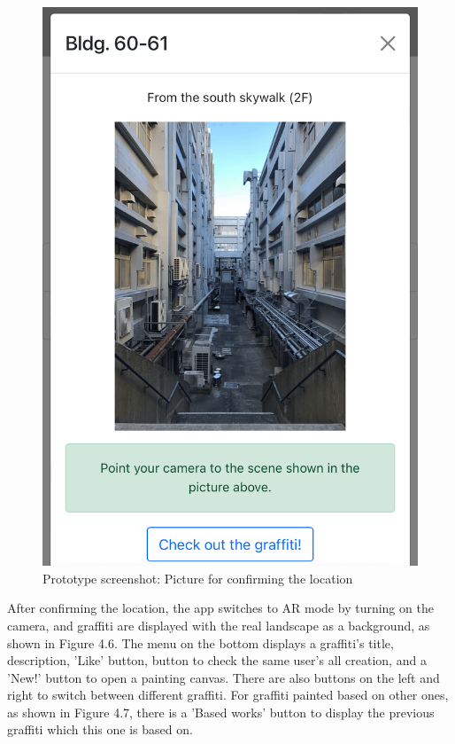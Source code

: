 \begin{figure}
\begin{minipage}{0.48\textwidth}
    \includegraphics[width=0.9\linewidth]{resources/4_methodology/prototype_loc_pic.png}
      \caption{Prototype screenshot: Picture for confirming the location}
  \end{minipage}
\end{figure}

After confirming the location, the app switches to AR mode by turning on the camera, and graffiti are displayed with the real landscape as a background, as shown in Figure 4.6.
The menu on the bottom displays a graffiti's title, description, 'Like' button, button to check the same user's all creation, and a 'New!' button to open a painting canvas.
There are also buttons on the left and right to switch between different graffiti.
For graffiti painted based on other ones, as shown in Figure 4.7, there is a 'Based works' button to display the previous graffiti which this one is based on.

